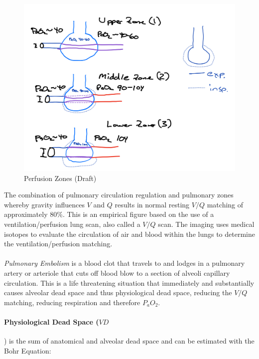 \begin{figure}[!h]
    \centering
    \includegraphics[width=1.0 \linewidth]{./figure/ventilation/perfusion_zones.png}
    \caption{Perfusion Zones (Draft)}
    \label{fig:perfusion_zones}
\end{figure}

The combination of pulmonary circulation regulation and pulmonary zones whereby gravity influences $V$ and $Q$ results in normal resting $V/Q$ matching of approximately 80\%. This is an empirical figure based on the use of a ventilation/perfusion lung scan, also called a $V/Q$ scan.  The imaging uses medical isotopes to evaluate the circulation of air and blood within the lungs to determine the ventilation/perfusion matching. 

\paragraph{} \textit{Pulmonary Embolism} is a blood clot that travels to and lodges in a pulmonary artery or arteriole that cuts off blood blow to a section of alveoli capillary circulation. This is a life threatening situation that immediately and substantially causes alveolar dead space and thus physiological dead space, reducing the $V/Q$ matching, reducing respiration and therefore $P_aO_2$.


\paragraph{Physiological Dead Space ($VD$}) is the sum of anatomical and alveolar dead space and can be estimated with the Bohr Equation:

